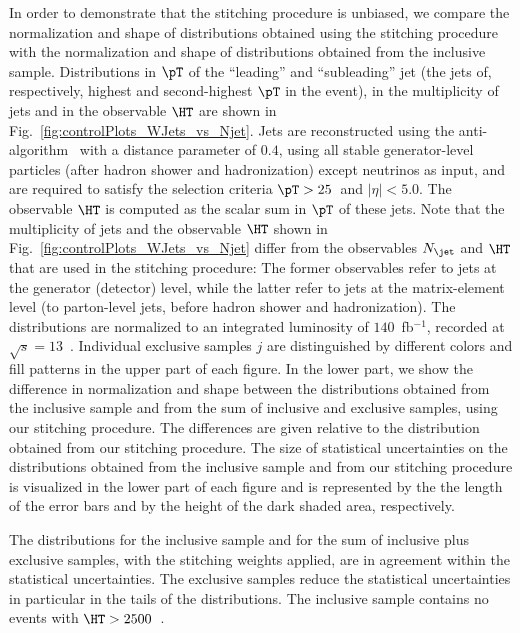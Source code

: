 In order to demonstrate that the stitching procedure is unbiased,
we compare the normalization and shape of distributions obtained using the stitching procedure with the normalization and shape of distributions obtained from the inclusive sample.
Distributions in $\pT$ of the ``leading'' and ``subleading'' jet (the jets of, respectively, highest and second-highest $\pT$ in the event),
in the multiplicity of jets and in the observable $\HT$ are shown in Fig.~\ref{fig:controlPlots_WJets_vs_Njet}.
Jets are reconstructed using the anti-\kt algorithm~\cite{Cacciari:2008gp,Cacciari:2011ma} with a distance parameter of $0.4$,
using all stable generator-level particles (after hadron shower and hadronization) except neutrinos as input, and are required to satisfy the selection criteria $\pT > 25$~\GeV and $\vert\eta\vert < 5.0$.
The observable $\HT$ is computed as the scalar sum in $\pT$ of these jets.
Note that the multiplicity of jets and the observable $\HT$ shown in Fig.~\ref{fig:controlPlots_WJets_vs_Njet} 
differ from the observables $N_{\jet}$ and $\HT$ that are used in the stitching procedure:
The former observables refer to jets at the generator (detector) level, while the latter refer to jets at the matrix-element level (\ie to parton-level jets, before hadron shower and hadronization).
The distributions are normalized to an integrated luminosity of $140$~fb$^{-1}$, recorded at $\sqrt{s}=13$~\TeV.
Individual exclusive samples $j$ are distinguished by different colors and fill patterns in the upper part of each figure.
In the lower part, we show the difference in normalization and shape between the distributions obtained from the inclusive sample and from the sum of inclusive and exclusive samples,
using our stitching procedure.
The differences are given relative to the distribution obtained from our stitching procedure.
The size of statistical uncertainties on the distributions obtained from the inclusive sample and from our stitching procedure
is visualized in the lower part of each figure and is represented by the the length of the error bars and by the height of the dark shaded area, respectively.

The distributions for the inclusive sample and for the sum of inclusive plus exclusive samples, with the stitching weights applied, are in agreement within the statistical uncertainties.
The exclusive samples reduce the statistical uncertainties in particular in the tails of the distributions.
The inclusive sample contains no events with $\HT > 2500$~\GeV. 

